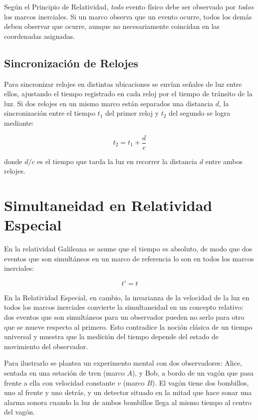 Según el Principio de Relatividad, \textit{todo} evento físico debe ser observado por \textit{todos} los marcos inerciales. Si un marco observa que un evento ocurre, todos los demás deben observar que ocurre, aunque no necesariamente coincidan en las coordenadas asignadas.

\subsection{Sincronización de Relojes}

Para sincronizar relojes en distintas ubicaciones se envían señales de luz entre ellos, ajustando el tiempo registrado en cada reloj por el tiempo de tránsito de la luz. Si dos relojes en un mismo marco están separados una distancia $d$, la sincronización entre el tiempo $t_1$ del primer reloj y $t_2$ del segundo se logra mediante:

$$
t_2 = t_1 + \frac{d}{c}
$$

donde $d/c$ es el tiempo que tarda la luz en recorrer la distancia $d$ entre ambos relojes.


\section{Simultaneidad en Relatividad Especial}

En la relatividad Galileana se asume que el tiempo es absoluto, de modo que dos eventos que son simultáneos en un marco de referencia lo son en todos los marcos inerciales:

$$ t' = t $$

En la Relatividad Especial, en cambio, la invarianza de la velocidad de la luz en todos los marcos inerciales convierte la simultaneidad en un concepto relativo: dos eventos que son simultáneos para un observador pueden no serlo para otro que se mueve respecto al primero. Esto contradice la noción clásica de un tiempo universal y muestra que la medición del tiempo depende del estado de movimiento del observador.

Para ilustrarlo se plantea un experimento mental con dos observadores: Alice, sentada en una estación de tren (marco $A$), y Bob, a bordo de un vagón que pasa frente a ella con velocidad constante $v$ (marco $B$). El vagón tiene dos bombillos, uno al frente y uno detrás, y un detector situado en la mitad que hace sonar una alarma sonora cuando la luz de ambos bombillos llega al mismo tiempo al centro del vagón.



